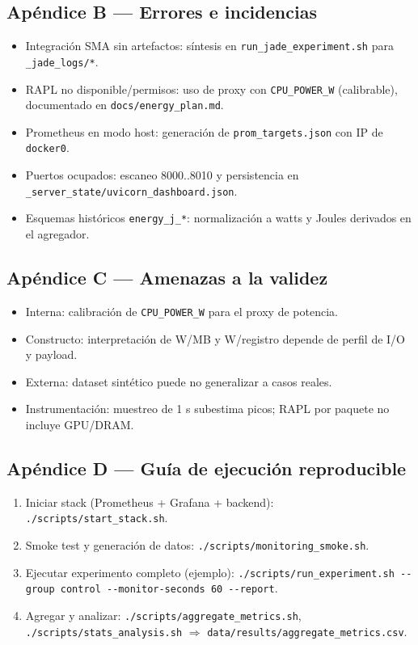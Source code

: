 \subsection*{Apéndice B — Errores e incidencias}
\begin{itemize}
  \item Integración SMA sin artefactos: síntesis en \verb|run_jade_experiment.sh| para \verb|_jade_logs/*|.
  \item RAPL no disponible/permisos: uso de proxy con \verb|CPU_POWER_W| (calibrable), documentado en \verb|docs/energy_plan.md|.
  \item Prometheus en modo host: generación de \verb|prom_targets.json| con IP de \verb|docker0|.
  \item Puertos ocupados: escaneo 8000..8010 y persistencia en \verb|_server_state/uvicorn_dashboard.json|.
  \item Esquemas históricos \verb|energy_j_*|: normalización a watts y Joules derivados en el agregador.
\end{itemize}

\subsection*{Apéndice C — Amenazas a la validez}
\begin{itemize}
  \item Interna: calibración de \verb|CPU_POWER_W| para el proxy de potencia.
  \item Constructo: interpretación de W/MB y W/registro depende de perfil de I/O y payload.
  \item Externa: dataset sintético puede no generalizar a casos reales.
  \item Instrumentación: muestreo de 1 s subestima picos; RAPL por paquete no incluye GPU/DRAM.
\end{itemize}

\subsection*{Apéndice D — Guía de ejecución reproducible}
\begin{enumerate}
  \item Iniciar stack (Prometheus + Grafana + backend): \verb|./scripts/start_stack.sh|.
  \item Smoke test y generación de datos: \verb|./scripts/monitoring_smoke.sh|.
  \item Ejecutar experimento completo (ejemplo): \verb|./scripts/run_experiment.sh --group control --monitor-seconds 60 --report|.
  \item Agregar y analizar: \verb|./scripts/aggregate_metrics.sh|, \verb|./scripts/stats_analysis.sh| $\Rightarrow$ \verb|data/results/aggregate_metrics.csv|.
\end{enumerate}
